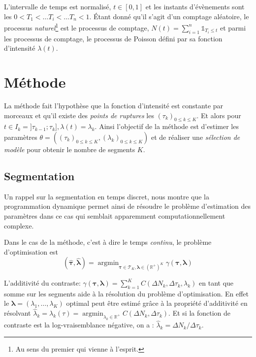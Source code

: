 \documentclass[a4paper,10pt]{article}\usepackage[]{graphicx}\usepackage[]{xcolor}
\DeclareMathOperator*{\argmin}{argmin}
\newcommand{\R}{\mathbb{R}}
\newcommand{\segspace}{\mathcal{T}_K}
\begin{document}
L'intervalle de temps est normalisé, $t\in[0,1]$ et les instants d'évènements 
sont les $0<T_1<\dots T_i<\dots T_n < 1$.
Étant donné qu'il s'agit d'un comptage aléatoire, le processus \emph{naturel}\footnote{Au sens du premier qui vienne à l'esprit.}
est le processus de comptage, $N(t) = \sum_{i=1}^n \mathds{1}_{T_i \leq t}$ et 
parmi les processus de comptage, le processus de Poisson défini par sa fonction 
d'intensité $\lambda(t)$.\\

\section{Méthode}

La méthode fait l'hypothèse que la fonction d'intensité est constante par 
morceaux et qu'il existe des \emph{points de ruptures} les $(\tau_k)_{0\leq k \leq K}$.
Et alors pour $t \in I_k = ] \tau_{k-1}; \tau_{k} ], \lambda(t) = \lambda_k$.
Ainsi l'objectif de la méthode est d'estimer les paramètres 
$\theta =((\tau_k)_{0\leq k \leq K}, (\lambda_k)_{0\leq k \leq K} )$ et de 
réaliser une \emph{sélection de modèle} pour obtenir le nombre de segments $K$.

\subsection{Segmentation}

Un rappel sur la segmentation en temps discret, nous montre que la programmation
dynamique permet ainsi de résoudre le problème d'estimation des paramètres dans 
ce cas qui semblait apparemment computationnellement complexe.

Dans le cas de la méthode, c'est à dire le temps \emph{continu}, le problème d'optimisation est 
$$(\widehat{\bm{\tau}}, \widehat{\bm{\lambda}}) = 
\argmin_{\bm{\tau}\in\segspace, \bm{\lambda} \in (\R^+)^K} \gamma (\bm{\tau}, \bm{\lambda})$$

L'additivité du contraste: $\gamma(\bm\tau, \bm\lambda) = 
\sum_{k=1}^K C(\Delta N_k, \Delta\tau_k, \lambda_k)$ en tant que somme sur les 
segments aide à la résolution du problème d'optimisation.
En effet le $\bm \lambda = (\lambda_1, \dots, \lambda_K)$ optimal peut être estimé grâce à la propriété d'additivité
en résolvant $\widehat \lambda_k = \lambda_k (\tau) = \argmin_{\lambda_k \in \R^+} 
C(\Delta N_k, \Delta\tau_k)$.
Et si la fonction de contraste est la log-vraisemblance négative, on a : 
$\widehat \lambda_k = \Delta N_k / \Delta \tau_k$.
\end{document}
